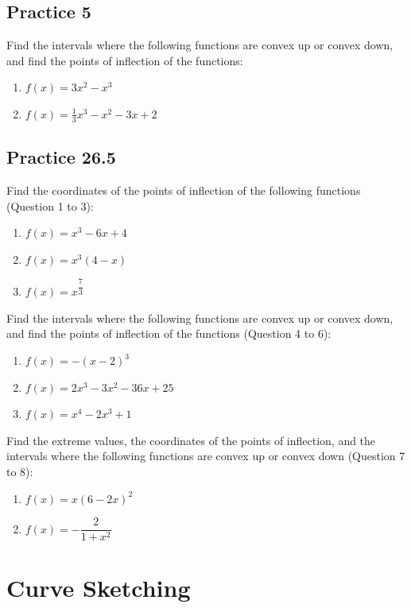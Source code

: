 \documentclass{report}
\begin{document}
\subsection{Practice 5}

Find the intervals where the following functions are convex up or convex down,
and find the points of inflection of the functions:
\begin{enumerate}
    \item $f(x)=3 x^2-x^3$
    \item $f(x)=\frac{1}{3} x^3-x^2-3 x+2$
\end{enumerate}

\subsection{Practice 26.5}
Find the coordinates of the points of inflection of the following functions
(Question 1 to 3):
\begin{enumerate}
    \item $f(x)=x^3-6 x+4$
    \item $f(x)=x^3(4-x)$
    \item $f(x)=x^{\dfrac{7}{3}}$
\end{enumerate}

Find the intervals where the following functions are convex up or convex down,
and find the points of inflection of the functions (Question 4 to 6):
\begin{enumerate}[resume]
    \item $f(x)=-(x-2)^3$
    \item $f(x)=2 x^3-3 x^2-36 x+25$
    \item $f(x)=x^4-2 x^3+1$
\end{enumerate}

Find the extreme values, the coordinates of the points of inflection, and the
intervals where the following functions are convex up or convex down (Question
7 to 8):
\begin{enumerate}[resume]
    \item $f(x)=x(6-2 x)^2$
    \item $f(x)=-\dfrac{2}{1+x^2}$
\end{enumerate}

\section{Curve Sketching}
\end{document}
